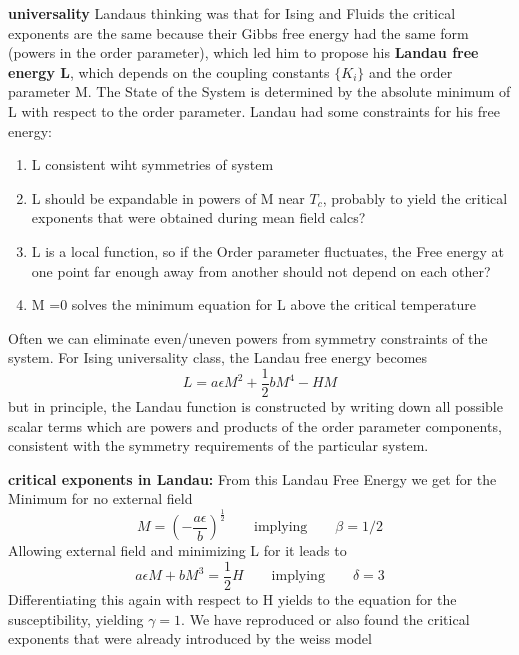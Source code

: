 	\textbf{universality}
	Landaus thinking was that for Ising and Fluids the critical exponents are the same because their Gibbs free energy had the same form (powers in the order parameter), which led him to propose his \textbf{Landau free energy L}, which depends on the coupling constants $\lbrace K_i \rbrace$ and the order parameter M. The State of the System is determined by the absolute minimum of L with respect to the order parameter. Landau had some constraints for his free energy:
	\begin{enumerate}
		\item L consistent wiht symmetries of system
		\item L should be expandable in powers of M near $T_c$, probably to yield the critical exponents that were obtained during mean field calcs?
		\item L	is a local function, so if the Order parameter fluctuates, the Free energy at one point far enough away from another should not depend on each other?
		\item M =0 solves the minimum equation for L above the critical temperature
	\end{enumerate}
	Often we can eliminate even/uneven powers from symmetry constraints of the system. For Ising universality class, the Landau free energy becomes
	\begin{equation}
		L = a\epsilon M^2 + \frac{1}{2}b M^4 - H M
	\end{equation}
	but in principle, the Landau function is constructed by writing down all possible scalar terms which are powers and products of the order parameter components, consistent with the symmetry requirements of the particular system.
	
	\textbf{critical exponents in Landau:}
	From this Landau Free Energy we get for the Minimum for no external field
	\begin{equation}
		M =	\left(-\frac{a\epsilon}{b}\right)^{\frac{1}{2}} \qquad \text{implying} \qquad \beta =	1/ 2
	\end{equation}
	Allowing external field and minimizing L for it leads to
	\begin{equation}
		a \epsilon M	 + b M^3 =	\frac{1}{2} H \qquad \text{implying} \qquad \delta = 3
	\end{equation}
	Differentiating this again with respect to H yields to the equation for the susceptibility, yielding $\gamma =	1$. We have reproduced or also found the critical exponents that were already introduced by the weiss model
	
